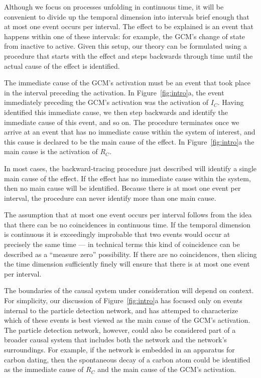 \documentclass[10pt,letterpaper]{article}
\newcommand{\ev}[2]{$#1_#2$}
\begin{document}
Although we focus on processes unfolding in continuous time, it will be convenient to divide up the temporal dimension into intervals brief enough that at most one event occurs per interval. The effect to be explained is an event that happens within one of these intervals: for example, the GCM's change of state from inactive to active. Given this setup, our theory can be formulated using a procedure that starts with the effect and steps backwards through time until the actual cause of the effect is identified.

The immediate cause of the GCM's activation must be an event that took place in the interval preceding the activation. In Figure~\ref{fig:intro}a, the event immediately preceding the GCM's activation was the activation of \ev{I}{C}. Having identified this immediate cause, we then step backwards and identify the immediate cause of this event, and so on.  The procedure terminates once we arrive at an event that has no immediate cause within the system of interest, 
and this cause is declared to be the main cause of the effect.  In Figure~\ref{fig:intro}a the main cause is the activation of \ev{R}{C}. 

In most cases, the backward-tracing procedure just described will identify a single main cause of the effect. If the effect has no immediate cause within the system, then no main cause will be identified. Because there is at most one event per interval, the procedure can never identify more than one main cause.

The assumption that at most one event occurs per interval follows from the idea that there can be no coincidences in continuous time. If the temporal dimension is continuous it is exceedingly improbable that two events would occur at precisely the same time --- in technical terms this kind of coincidence can be described as a ``measure zero'' possibility. If there are no coincidences, then slicing the time dimension sufficiently finely will ensure that there is at most one event per interval.

The boundaries of the causal system under consideration will depend on context. For simplicity, our discussion of Figure~\ref{fig:intro}a has focused only on events internal to the particle detection network, and has attemped to characterize which of these events is best viewed as the main cause of the GCM's activation. The particle detection network, however, could also be considered part of a broader causal system that includes both the network and the network's surroundings. For example, if the network is embedded in an apparatus for carbon dating, then the spontaneous decay of a carbon atom could be identified as the immediate cause of \ev{R}{C} and the main cause of the GCM's activation.
\end{document}
